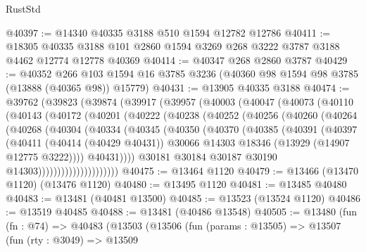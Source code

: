 \begin{lexlean}{RustStd}
\begin{coremodule}
@40397 := @14340 @40335 @3188 @510 @1594 @12782 @12786
@40411 := @18305
    @40335
    @3188
    @101
    @2860
    @1594
    @3269
    @268
    @3222
    @3787
    @3188
    @4462
    @12774
    @12778
    @40369
@40414 := @40347 @268 @2860 @3787
@40429 := @40352
    @266
    @103
    @1594
    @16
    @3785
    @3236
    (@40360 @98 @1594 @98 @3785 (@13888 (@40365 @98)) @15779)
@40431 := @13905 @40335 @3188
@40474 := @39762
    (@39823
      (@39874
        (@39917
          (@39957
            (@40003
              (@40047
                (@40073
                  (@40110
                    (@40143
                      (@40172
                        (@40201
                          (@40222
                            (@40238
                              (@40252
                                (@40256
                                  (@40260
                                    (@40264
                                      (@40268
                                        (@40304
                                          (@40334
                                            (@40345
                                              (@40350
                                                (@40370
                                                  (@40385
                                                    (@40391
                                                      (@40397
                                                        (@40411
                                                          (@40414 (@40429 @40431))
                                                          @30066
                                                          @14303
                                                          @18346
                                                          (@13929 (@14907 @12775 @3222))))
                                                      @40431))))
                                              @30181
                                              @30184
                                              @30187
                                              @30190
                                              @14303)))))))))))))))))))))
@40475 := @13464 @1120
@40479 := @13466 (@13470 @1120) (@13476 @1120)
@40480 := @13495 @1120
@40481 := @13485 @40480
@40483 := @13481 (@40481 @13500)
@40485 := @13523 (@13524 @1120)
@40486 := @13519 @40485
@40488 := @13481 (@40486 @13548)
@40505 := @13480
    (fun (fn : @74) =>
    @40483
      (@13503
        (@13506
          (fun (params : @13505) =>
          @13507
            (fun (rty : @3049) =>
            @13509

\end{coremodule}
\end{lexlean}
